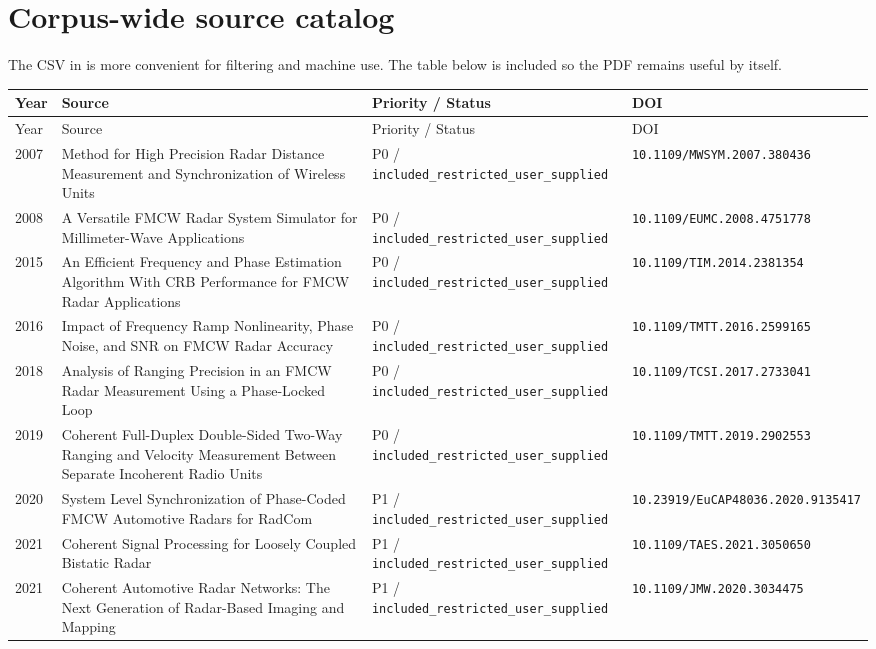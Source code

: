 \documentclass[11pt]{article}
\newcommand{\codeword}[1]{\path{#1}}
\begin{document}
\section{Corpus-wide source catalog}
The CSV in \codeword{00_START_HERE/bibliography.csv} is more convenient for filtering and machine use. The table below is included so the PDF remains useful by itself.
\small
\begin{longtable}{@{}p{}p{}p{}p{}@{}}
\toprule Year & Source & Priority / Status & DOI \\ \midrule
\endfirsthead
\toprule Year & Source & Priority / Status & DOI \\ \midrule
\endhead
2007 & Method for High Precision Radar Distance Measurement and Synchronization of Wireless Units & P0 / \nolinkurl{included_restricted_user_supplied} & \nolinkurl{10.1109/MWSYM.2007.380436} \\
2008 & A Versatile FMCW Radar System Simulator for Millimeter-Wave Applications & P0 / \nolinkurl{included_restricted_user_supplied} & \nolinkurl{10.1109/EUMC.2008.4751778} \\
2015 & An Efficient Frequency and Phase Estimation Algorithm With CRB Performance for FMCW Radar Applications & P0 / \nolinkurl{included_restricted_user_supplied} & \nolinkurl{10.1109/TIM.2014.2381354} \\
2016 & Impact of Frequency Ramp Nonlinearity, Phase Noise, and SNR on FMCW Radar Accuracy & P0 / \nolinkurl{included_restricted_user_supplied} & \nolinkurl{10.1109/TMTT.2016.2599165} \\
2018 & Analysis of Ranging Precision in an FMCW Radar Measurement Using a Phase-Locked Loop & P0 / \nolinkurl{included_restricted_user_supplied} & \nolinkurl{10.1109/TCSI.2017.2733041} \\
2019 & Coherent Full-Duplex Double-Sided Two-Way Ranging and Velocity Measurement Between Separate Incoherent Radio Units & P0 / \nolinkurl{included_restricted_user_supplied} & \nolinkurl{10.1109/TMTT.2019.2902553} \\
2020 & System Level Synchronization of Phase-Coded FMCW Automotive Radars for RadCom & P1 / \nolinkurl{included_restricted_user_supplied} & \nolinkurl{10.23919/EuCAP48036.2020.9135417} \\
2021 & Coherent Signal Processing for Loosely Coupled Bistatic Radar & P1 / \nolinkurl{included_restricted_user_supplied} & \nolinkurl{10.1109/TAES.2021.3050650} \\
2021 & Coherent Automotive Radar Networks: The Next Generation of Radar-Based Imaging and Mapping & P1 / \nolinkurl{included_restricted_user_supplied} & \nolinkurl{10.1109/JMW.2020.3034475} \\

\end{longtable}
\end{document}
